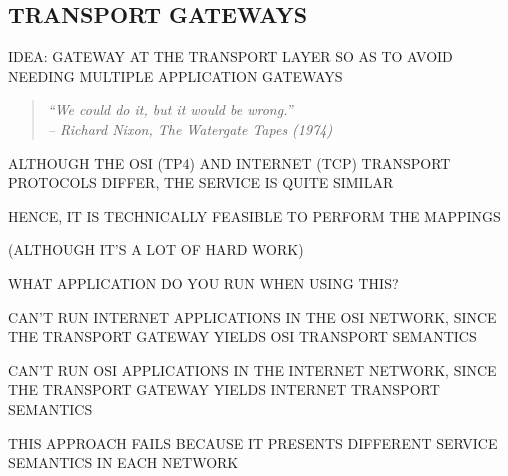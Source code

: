 \begin{bwslide}
\part*	{TRANSPORT GATEWAYS}\bf

\begin{nrtc}
\item	IDEA: GATEWAY AT THE TRANSPORT LAYER SO AS TO AVOID NEEDING
	MULTIPLE APPLICATION GATEWAYS
\begin{quote}\em
``We could do it, but it would be wrong.''\\ \raggedleft
-- Richard Nixon, The Watergate Tapes (1974)
\end{quote}

\item	ALTHOUGH THE OSI (TP4) AND INTERNET (TCP) TRANSPORT PROTOCOLS DIFFER,
	THE SERVICE IS QUITE SIMILAR

\item	HENCE, IT IS TECHNICALLY FEASIBLE TO PERFORM THE MAPPINGS
    \begin{nrtc}
    \item	(ALTHOUGH IT'S A LOT OF HARD WORK)
    \end{nrtc}
\end{nrtc}
\end{bwslide}




\begin{bwslide}

\begin{nrtc}
\item	WHAT APPLICATION DO YOU RUN WHEN USING THIS?
    \begin{nrtc}
    \item	CAN'T RUN INTERNET APPLICATIONS IN THE OSI NETWORK,
		SINCE THE TRANSPORT GATEWAY YIELDS OSI TRANSPORT SEMANTICS

    \item	CAN'T RUN OSI APPLICATIONS IN THE INTERNET NETWORK,
		SINCE THE TRANSPORT GATEWAY YIELDS INTERNET TRANSPORT SEMANTICS
    \end{nrtc}

\item	THIS APPROACH FAILS BECAUSE IT PRESENTS DIFFERENT SERVICE SEMANTICS
	IN EACH NETWORK
\end{nrtc}
\end{bwslide}


